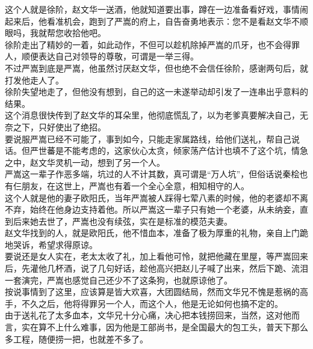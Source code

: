 \begin{multicols}{\theparacolNo}
这个人就是徐阶，赵文华一送酒，他就知道要出事，蹲在一边准备看好戏，事情闹起来后，他看准机会，跑到了严嵩的府上，自告奋勇地表示：您不是看赵文华不顺眼吗，我就帮您收拾他吧。\\

徐阶走出了精妙的一着，如此动作，不但可以趁机除掉严嵩的爪牙，也不会得罪人，顺便表达自己对领导的尊敬，可谓是一举三得。\\

不过严嵩到底是严嵩，他虽然讨厌赵文华，但也绝不会信任徐阶，感谢两句后，就打发他走人了。\\

徐阶失望地走了，但他没有想到，自己的这一未遂举动却引发了一连串出乎意料的结果。\\

这个消息很快传到了赵文华的耳朵里，他彻底慌乱了，以为老爹真要解决自己，无奈之下，只好使出了绝招。\\

要说服严嵩已经不可能了，事到如今，只能走家属路线，给他们送礼，帮自己说话。但严世蕃是不能考虑的，这家伙心太贪，倾家荡产估计也填不了这个坑，情急之中，赵文华灵机一动，想到了另一个人。\\

严嵩这一辈子作恶多端，坑过的人不计其数，真可谓是“万人坑”，但俗话说秦桧也有仨朋友，在这世上，严嵩也有着一个全心全意，相知相守的人。\\

这个人就是他的妻子欧阳氏，当年严嵩被人踩得七荤八素的时候，他的老婆却不离不弃，始终在他身边支持着他。所以严嵩这一辈子只有她一个老婆，从未纳妾，直到后来她去世了，严嵩也没有续弦，实在是标准的模范夫妻。\\

赵文华找到的人，就是欧阳氏，他不惜血本，准备了极为厚重的礼物，亲自上门跪地哭诉，希望求得原谅。\\

要说还是女人实在，老太太收了礼，加上看他可怜，就把他藏在里屋，等严嵩回来后，先灌他几杯酒，说了几句好话，趁他高兴把赵儿子喊了出来，然后下跪、流泪一套演完，严嵩也感觉自己还少不了这条狗，也就原谅他了。\\

按说事情到了这里，应该算是皆大欢喜，大团圆结局，然而文华兄不愧是惹祸的高手，不久之后，他将得罪另一个人，而这个人，他是无论如何也搞不定的。\\

由于送礼花了太多血本，文华兄十分心痛，决心把本钱捞回来，当然，这对他而言，实在算不上什么难事，因为他是工部尚书，是全国最大的包工头，普天下那么多工程，随便捞一把，也就差不多了。\\


\end{multicols}
